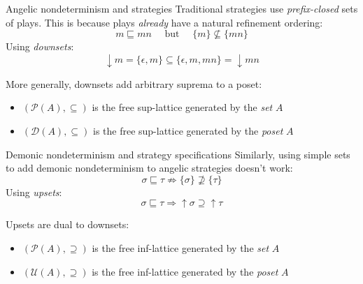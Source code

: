 \documentclass[aspectratio=54]{beamer}
\begin{document}
\begin{frame}{Angelic nondeterminism and strategies} %
  Traditional strategies use
  \emph{prefix-closed} sets of plays.
  This is because plays \emph{already} have
  a natural refinement ordering:
  \[
    m \sqsubseteq mn
    \quad \mbox{ but } \quad
    \{m\} \nsubseteq \{mn\}
  \]
  Using \emph{downsets}:
  \[
    {\downarrow} m = \{\epsilon, m\} \subseteq \{\epsilon, m, mn\} = {\downarrow} mn
  \]

  More generally,
  downsets add arbitrary suprema to a poset:
  \begin{itemize}
    \item $(\mathcal{P}(A), {\subseteq})$ is the
      free sup-lattice generated by the \emph{set} $A$
    \item $(\mathcal{D}(A), {\subseteq})$ is the
      free sup-lattice generated by the \emph{poset} $A$
  \end{itemize}
\end{frame}

\begin{frame}{Demonic nondeterminism and strategy specifications} %
  Similarly,
  using simple sets to add demonic nondeterminism to angelic strategies
  doesn't work:
  \[
    \sigma \sqsubseteq \tau \nRightarrow
    \{\sigma\} \nsupseteq \{\tau\}
  \]
  Using \emph{upsets}:
  \[
    \sigma \sqsubseteq \tau \Rightarrow
    {\uparrow} \sigma \supseteq {\uparrow} \tau
  \]

  Upsets are dual to downsets:
  \begin{itemize}
    \item $(\mathcal{P}(A), {\supseteq})$ is the
      free inf-lattice generated by the \emph{set} $A$
    \item $(\mathcal{U}(A), {\supseteq})$ is the
      free inf-lattice generated by the \emph{poset} $A$
  \end{itemize}
\end{frame}
\end{document}
